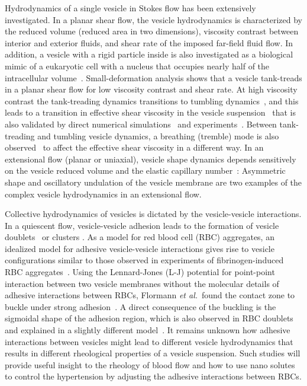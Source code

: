 \documentclass[prf,superscriptaddress,showpacs]{revtex4-1}
\begin{document}
Hydrodynamics of a single vesicle in Stokes flow has been extensively
investigated. In a planar shear flow, the vesicle hydrodynamics is
characterized by the reduced volume (reduced area in two dimensions),
viscosity contrast between interior and exterior fluids, and shear rate
of the imposed far-field fluid flow. In addition, a vesicle with a rigid
particle inside is also investigated as a biological mimic of a
eukaryotic cell with a nucleus that occupies nearly half of the
intracellular volume~\cite{Veerapaneni2011_PRL}. Small-deformation
analysis shows that a vesicle tank-treads in a planar shear flow for low
viscosity contrast and shear rate. At high viscosity contrast the
tank-treading dynamics transitions to tumbling 
dynamics~\cite{Misbah2006_PRL, Vlahovska2007_PRE}, and this leads to a
transition in effective shear viscosity in the vesicle
suspension~\cite{Misbah2006_PRL,Vitkova2008_BJ} that is also validated
by direct numerical simulations~\cite{GhigliottiBibenMisbah2010_JFM} and
experiments~\cite{KantslerSegreSteinberg2008_EPL,
ZabuskySegreDeschamps2011_PoF}.  Between tank-treading and tumbling
vesicle dynamics, a breathing (tremble) mode is also
observed~\cite{Misbah2006_PRL,KantslerSegreSteinberg2008_PRL,
ZhaoShaqfeh2011_JFM, SpannZhaoShaqfeh2014_PoF} to affect the effective
shear viscosity in a different way.  In an extensional flow (planar or
uniaxial), vesicle shape dynamics depends sensitively on the vesicle
reduced volume and the elastic capillary
number~\cite{KantslerSegreSteinberg2008_PRL, ZhaoShaqfeh2013_JFM,
Narsimhan2014_JFM, DahlNarsimhanGouveia2016_SoftMatt}: Asymmetric shape
and oscillatory undulation of the vesicle membrane are two examples of
the complex vesicle hydrodynamics in an extensional flow.

Collective hydrodynamics of vesicles is dictated by the vesicle-vesicle
interactions.  In a quiescent flow, vesicle-vesicle adhesion leads to
the formation of vesicle doublets~\cite{Ziherl2007_PRL,
ZiherlSvetina2007_PNAS} or clusters
\cite{SvetinaZiherl2008_Bioelectrochemistry,
FlormannAouane2017_SciReports}.  As a model for red blood cell (RBC)
aggregates, an idealized model for adhesive vesicle-vesicle interactions
gives rise to vesicle configurations similar to those observed in
experiments of fibrinogen-induced RBC
aggregates~\cite{SvetinaZiherl2008_Bioelectrochemistry,
FlormannAouane2017_SciReports}.  Using the Lennard-Jones (L-J) potential
for point-point interaction between two vesicle membranes without the
molecular details of adhesive interactions between RBCs, Flormann {\em
et al.}~found the contact zone to buckle under strong
adhesion~\cite{FlormannAouane2017_SciReports}.  A direct consequence of
the buckling is the sigmoidal shape of the adhesion region, which is
also observed in RBC doublets and explained in a slightly different
model~\cite{ZiherlSvetina2007_PNAS}.  It remains unknown how adhesive
interactions between vesicles might lead to different vesicle
hydrodynamics that results in different rheological properties of a
vesicle suspension. Such studies will provide useful insight to the
rheology of blood flow and how to use nano solutes to control the
hypertension by adjusting the adhesive interactions between RBCs.
\end{document}
